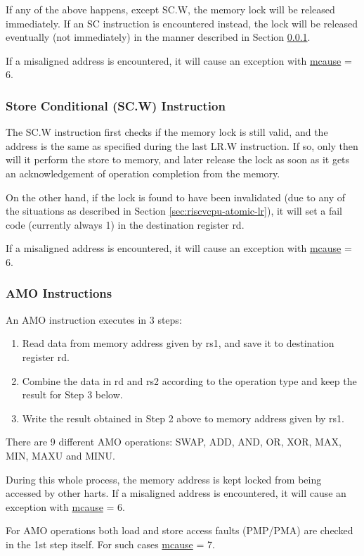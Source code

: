 \documentclass[main\_\_EN.tex]{subfiles}
\begin{document}
If any of the above happens, except SC.W, the memory lock will be released immediately. If an SC instruction is encountered instead, the lock will be released eventually (not immediately) in the manner described in Section \ref{sec:riscvcpu-atomic-sc}.

If a misaligned address is encountered, it will cause an exception with \hyperref[regdesc:MCAUSE]{mcause} = 6.

\subsubsection{Store Conditional (SC.W) Instruction}
\label{sec:riscvcpu-atomic-sc}

The SC.W instruction first checks if the memory lock is still valid, and the address is the same as specified during the last LR.W instruction. If so, only then will it perform the store to memory, and later release the lock as soon as it gets an acknowledgement of operation completion from the memory.

On the other hand, if the lock is found to have been invalidated (due to any of the situations as described in Section \ref{sec:riscvcpu-atomic-lr}), it will set a fail code (currently always 1) in the destination register rd.

If a misaligned address is encountered, it will cause an exception with \hyperref[regdesc:MCAUSE]{mcause} = 6.

\subsubsection{AMO Instructions}
\label{sec:riscvcpu-atomic-amo}

An AMO instruction executes in 3 steps:

\begin{enumerate}
    \item Read data from memory address given by rs1, and save it to destination register rd.
    \item Combine the data in rd and rs2 according to the operation type and keep the result for Step 3 below.
    \item Write the result obtained in Step 2 above to memory address given by rs1.
\end{enumerate}

There are 9 different AMO operations: SWAP, ADD, AND, OR, XOR, MAX, MIN, MAXU and MINU.

During this whole process, the memory address is kept locked from being accessed by other harts. If a misaligned address is encountered, it will cause an exception with \hyperref[regdesc:MCAUSE]{mcause} = 6.

For AMO operations both load and store access faults (PMP/PMA) are checked in the 1st step itself. For such cases \hyperref[regdesc:MCAUSE]{mcause} = 7.
\end{document}
